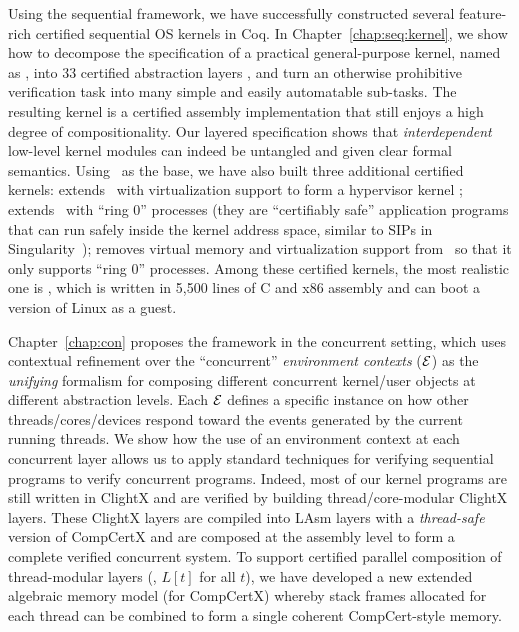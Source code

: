 
Using the sequential \CTOS{} framework, we have successfully
  constructed several feature-rich certified sequential OS kernels in Coq.
In   Chapter~\ref{chap:seq:kernel},
we show how to decompose the specification of 
a practical general-purpose kernel,
named as \textbf{\mCTOS{}},
into 33 certified abstraction layers , and turn an otherwise 
  prohibitive verification task into many simple and easily automatable 
  sub-tasks.  The resulting kernel is a certified assembly implementation 
  that still enjoys a high degree of compositionality.
  Our layered specification shows that
  {\em interdependent} low-level kernel modules can indeed be
  untangled and given clear formal semantics.
 Using \mCTOS\ as the base, we have also built three additional
  certified kernels: {\bf{}\mCTOShyper} extends \mCTOS\ with virtualization
  support to form a hypervisor kernel ;
  {\bf{}\mCTOSringz} extends \mCTOShyper\ with ``ring 0'' processes
  (they are ``certifiably safe'' application programs that can run safely 
  inside the kernel address space, similar to SIPs in 
  Singularity~\cite{hunt07}); {\bf{}\mCTOSembed} removes virtual memory
  and virtualization support from \mCTOSringz\ so that it only supports 
  ``ring 0'' processes.
  Among these certified kernels,
  the most realistic one is \mCTOShyper{},
  which is written in 5,500 lines of C and x86
assembly and can boot a version of Linux as a guest.   
  
 Chapter~\ref{chap:con} proposes 
the \CTOS{} framework in the concurrent setting,
 which uses
  contextual refinement over the ``concurrent'' {\em environment contexts}
  ($\mathcal{E}$) as the {\em unifying} formalism for composing 
  different concurrent kernel/user objects at different
  abstraction levels.  Each $\mathcal{E}$ defines a specific instance on how
  other threads/cores/devices respond toward the events generated by
  the current running threads.  
We show how the use of an environment context at each
  concurrent layer allows us to apply standard techniques for
  verifying sequential programs to verify concurrent programs.
   Indeed, most of our kernel programs are still written 
   in ClightX and are verified by building
   thread/core-modular ClightX layers.
 These ClightX layers are compiled
 into LAsm layers
   with a {\em thread-safe} version of CompCertX
   and are composed at the assembly level to form
   a complete verified concurrent system.
 To support certified parallel composition of
  thread-modular layers (\ie, $L[t]$ for all $t$), we have developed
  a new extended algebraic memory model (for CompCertX) whereby stack
  frames allocated for each thread can be combined to form a single
  coherent CompCert-style memory.

